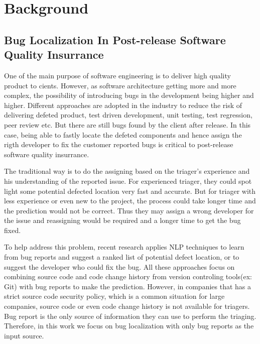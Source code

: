 \section{Background}
\subsection{Bug Localization In Post-release Software Quality Insurrance}
One of the main purpose of software engineering is to deliver high quality product to cients.
However, as software architecture getting more and more complex, the possibility of introducing bugs in the development being higher and higher.  
Different approaches are adopted in the industry to reduce the risk of delivering defeted product, test driven development, unit testing, test regression, peer review etc.
But there are still bugs found by the client after release. 
In this case, being able to fastly locate the defeted components and hence assign the rigth developer to fix the customer reported bugs is critical to post-release software quality insurrance. 

The traditional way is to do the assigning based on the triager's experience and his understanding of the reported issue. 
For experienced triager, they could spot light some potential defected location very fast and accurate.
But for triager with less experience or even new to the project, the process could take longer time and the prediction would not be correct.
Thus they may assign a wrong developer for the issue and reassigning would be required and a longer time to get the bug fixed. 

To help address this problem, recent research applies NLP techniques to learn from bug reports and suggest a ranked list of potential defect location\cite{gay2009use}\cite{lam2017bug}\cite{nguyen2011topic}\cite{zhou2012should}\cite{saha2013improving}\cite{shokripour2013so}, or to suggest the developer who could fix the bug\cite{anvik2011reducing}\cite{bhattacharya2010fine}\cite{xuan2012developer}\cite{jonsson2016automated}.
All these approaches focus on combining source code and code change history from version controling tools(ex: Git)  with bug reports to make the prediction.
However, in companies that has a strict source code security policy, which is a common situation for large companies, source code or even code change history is not available for triagers. 
Bug report is the only source of information they can use to perform the triaging.   
Therefore, in this work we focus on bug localization with only bug reports as the input source.



